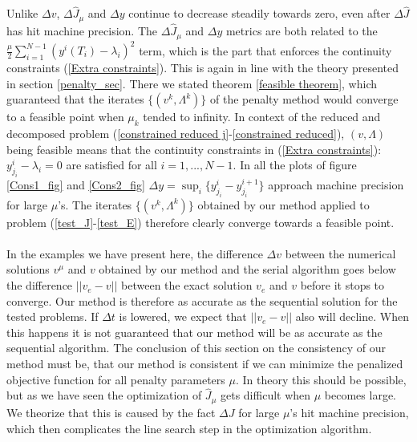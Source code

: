 \\
\\
Unlike $\Delta v$, $\Delta\hat J_{\mu}$ and $\Delta y$ continue to decrease steadily towards zero, even after $\Delta \hat J$ has hit machine precision. The $\Delta\hat J_{\mu}$ and $\Delta y$ metrics are both related to the $\frac{\mu }{2}\sum_{i=1}^{N-1}(y^i(T_{i})-\lambda_i)^2$ term, which is the part that enforces the continuity constraints (\ref{Extra constraints}). This is again in line with the theory presented in section \ref{penalty_sec}. There we stated theorem \ref{feasible theorem}, which guaranteed that the iterates $\{(v^{k},\Lambda^k)\}$ of the penalty method would converge to a feasible point when $\mu_k$ tended to infinity. In context of the reduced and decomposed problem (\ref{constrained reduced j}-\ref{constrained reduced}), $(v,\Lambda)$ being feasible means that the continuity constraints in (\ref{Extra constraints}): $y_{j_i}^i -\lambda_i =0$ are satisfied for all $i=1,...,N-1$. In all the plots of figure \ref{Cons1_fig} and \ref{Cons2_fig} $\Delta y= \sup_i\{y_{j_i}^i-y_{j_i}^{i+1}\}$ approach machine precision for large $\mu$'s. The iterates $\{(v^{k},\Lambda^k)\}$ obtained by our method applied to problem (\ref{test_J}-\ref{test_E}) therefore clearly converge towards a feasible point.
\\
\\
In the examples we have present here, the difference $\Delta v$ between the numerical solutions $v^{\mu}$ and $v$ obtained by our method and the serial algorithm goes below the difference $||v_e-v||$ between the exact solution $v_e$ and $v$ before it stops to converge. Our method is therefore as accurate as the sequential solution for the tested problems. If $\Delta t$ is lowered, we expect that $||v_e-v||$ also will decline. When this happens it is not guaranteed that our method will be as accurate as the sequential algorithm. The conclusion of this section on the consistency of our method must be, that our method is consistent if we can minimize the penalized objective function for all penalty parameters $\mu$. In theory this should be possible, but as we have seen the optimization of $\hat J_{\mu}$ gets difficult when $\mu$ becomes large. We theorize that this is caused by the fact $\Delta J$ for large $\mu$'s hit machine precision, which then complicates the line search step in the optimization algorithm. 
